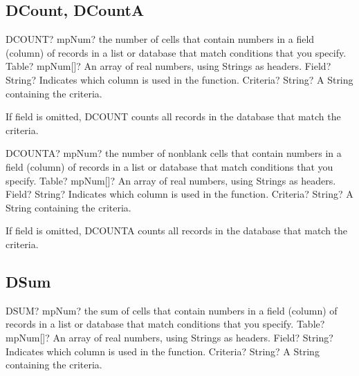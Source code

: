 \subsection{DCount, DCountA}

\begin{mpFunctionsExtract}
	\mpWorksheetFunctionThreeNotImplemented
	{DCOUNT? mpNum? the number of cells that contain numbers in a field (column) of records in a list or database that match conditions that you specify.}
	{Table? mpNum[]? An array of real numbers, using Strings as headers.}
	{Field? String? Indicates which column is used in the function.}
	{Criteria? String? A String containing the criteria.}
\end{mpFunctionsExtract}

\vspace{0.3cm}
If field is omitted, \textsf{DCOUNT} counts all records in the database that match the criteria.

\vspace{0.6cm}
\begin{mpFunctionsExtract}
	\mpWorksheetFunctionThreeNotImplemented
	{DCOUNTA? mpNum? the number of nonblank cells that contain numbers in a field (column) of records in a list or database that match conditions that you specify.}
	{Table? mpNum[]? An array of real numbers, using Strings as headers.}
	{Field? String? Indicates which column is used in the function.}
	{Criteria? String? A String containing the criteria.}
\end{mpFunctionsExtract}

\vspace{0.3cm}
If field is omitted, \textsf{DCOUNTA} counts all records in the database that match the criteria.



\subsection{DSum}

\begin{mpFunctionsExtract}
	\mpWorksheetFunctionThreeNotImplemented
	{DSUM? mpNum? the sum of cells that contain numbers in a field (column) of records in a list or database that match conditions that you specify.}
	{Table? mpNum[]? An array of real numbers, using Strings as headers.}
	{Field? String? Indicates which column is used in the function.}
	{Criteria? String? A String containing the criteria.}
\end{mpFunctionsExtract}





